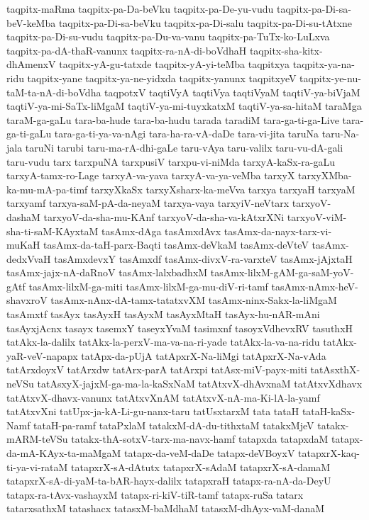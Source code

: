 {taqpitx-maRma
taqpitx-pa-Da-beVku
taqpitx-pa-De-yu-vudu
taqpitx-pa-Di-sa-beV-keMba
taqpitx-pa-Di-sa-beVku
taqpitx-pa-Di-salu
taqpitx-pa-Di-su-tAtxne
taqpitx-pa-Di-su-vudu
taqpitx-pa-Du-va-vanu
taqpitx-pa-TuTx-ko-LuLxva
taqpitx-pa-dA-thaR-vanunx
taqpitx-ra-nA-di-boVdhaH
taqpitx-sha-kitx-dhAmenxV
taqpitx-yA-gu-tatxde
taqpitx-yA-yi-teMba
taqpitxya
taqpitx-ya-na-ridu
taqpitx-yane
taqpitx-ya-ne-yidxda
taqpitx-yanunx
taqpitxyeV
taqpitx-ye-nu-taM-ta-nA-di-boVdha
taqpotxV
taqtiVyA
taqtiVya
taqtiVyaM
taqtiV-ya-biVjaM
taqtiV-ya-mi-SaTx-liMgaM
taqtiV-ya-mi-tuyxkatxM
taqtiV-ya-sa-hitaM
taraMga
taraM-ga-gaLu
tara-ba-hude
tara-ba-hudu
tarada
taradiM
tara-ga-ti-ga-Live
tara-ga-ti-gaLu
tara-ga-ti-ya-va-nAgi
tara-ha-ra-vA-daDe
tara-vi-jita
taruNa
taru-Na-jala
taruNi
tarubi
taru-ma-rA-dhi-gaLe
taru-vAya
taru-valilx
taru-vu-dA-gali
taru-vudu
tarx
tarxpuNA
tarxpusiV
tarxpu-vi-niMda
tarxyA-kaSx-ra-gaLu
tarxyA-tamx-ro-Lage
tarxyA-va-yava
tarxyA-va-ya-veMba
tarxyX
tarxyXMba-ka-mu-mA-pa-timf
tarxyXkaSx
tarxyXsharx-ka-meVva
tarxya
tarxyaH
tarxyaM
tarxyamf
tarxya-saM-pA-da-neyaM
tarxya-vaya
tarxyiV-neVtarx
tarxyoV-dashaM
tarxyoV-da-sha-mu-KAnf
tarxyoV-da-sha-va-kAtxrXNi
tarxyoV-viM-sha-ti-saM-KAyxtaM
tasAmx-dAga
tasAmxdAvx
tasAmx-da-nayx-tarx-vi-muKaH
tasAmx-da-taH-parx-Baqti
tasAmx-deVkaM
tasAmx-deVteV
tasAmx-dedxVvaH
tasAmxdevxY
tasAmxdf
tasAmx-divxV-ra-varxteV
tasAmx-jAjxtaH
tasAmx-jajx-nA-daRnoV
tasAmx-lalxbadhxM
tasAmx-lilxM-gAM-ga-saM-yoV-gAtf
tasAmx-lilxM-ga-miti
tasAmx-lilxM-ga-mu-diV-ri-tamf
tasAmx-nAmx-heV-shavxroV
tasAmx-nAnx-dA-tamx-tatatxvXM
tasAmx-ninx-Sakx-la-liMgaM
tasAmxtf
tasAyx
tasAyxH
tasAyxM
tasAyxMtaH
tasAyx-hu-nAR-mAni
tasAyxjAcnx
tasayx
tasemxY
taseyxYvaM
tasimxnf
tasoyxVdhevxRV
tasuthxH
tatAkx-la-dalilx
tatAkx-la-perxV-ma-va-na-ri-yade
tatAkx-la-va-na-ridu
tatAkx-yaR-veV-napapx
tatApx-da-pUjA
tatApxrX-Na-liMgi
tatApxrX-Na-vAda
tatArxdoyxV
tatArxdw
tatArx-parA
tatArxpi
tatAsx-miV-payx-miti
tatAsxthX-neVSu
tatAsxyX-jajxM-ga-ma-la-kaSxNaM
tatAtxvX-dhAvxnaM
tatAtxvXdhavx
tatAtxvX-dhavx-vanunx
tatAtxvXnAM
tatAtxvX-nA-ma-Ki-lA-la-yamf
tatAtxvXni
tatUpx-ja-kA-Li-gu-nanx-taru
tatUsxtarxM
tata
tataH
tataH-kaSx-Namf
tataH-pa-ramf
tataPxlaM
tatakxM-dA-du-tithxtaM
tatakxMjeV
tatakx-mARM-teVSu
tatakx-thA-sotxV-tarx-ma-navx-hamf
tatapxda
tatapxdaM
tatapx-da-mA-KAyx-ta-maMgaM
tatapx-da-veM-daDe
tatapx-deVBoyxV
tatapxrX-kaq-ti-ya-vi-rataM
tatapxrX-sA-dAtutx
tatapxrX-sAdaM
tatapxrX-sA-damaM
tatapxrX-sA-di-yaM-ta-bAR-hayx-dalilx
tatapxraH
tatapx-ra-nA-da-DeyU
tatapx-ra-tAvx-vashayxM
tatapx-ri-kiV-tiR-tamf
tatapx-ruSa
tatarx
tatarxsathxM
tatashacx
tatasxM-baMdhaM
tatasxM-dhAyx-vaM-danaM
}
